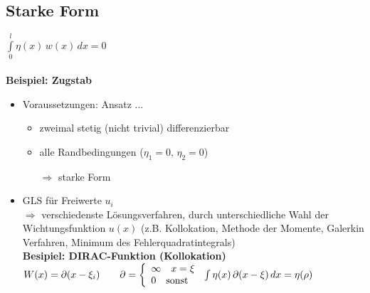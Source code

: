 \subsection{Starke Form}
{\boldmath\(\int\limits_0^l \eta (x) \, w(x) \, dx = 0\)}\\\\
\textbf{Beispiel: Zugstab}\\
\begin{itemize}
\item Voraussetzungen: Ansatz ...\\
	\begin{itemize}
	\item zweimal stetig (nicht trivial) differenzierbar
	\item alle Randbedingungen (\(\eta_1 = 0,\, \eta_2 = 0\))
	\item[$\Rightarrow$] starke Form 
	\end{itemize}
\item GLS für Freiwerte $u_i$\\
	$\Rightarrow$ verschiedenste Lösungsverfahren, durch unterschiedliche Wahl der Wichtungsfunktion $u(x)$ (z.B. Kollokation, Methode der Momente, Galerkin Verfahren, Minimum des Fehlerquadratintegrals)\\
	\textbf{Besipiel: DIRAC-Funktion (Kollokation)}\\
	\(W(x) = \partial (x - \xi_i) \qquad \partial = \left\{\begin{array}{l l} \infty \quad x = \xi \\ 0 \quad \text{sonst} \end{array} \right. \\ \int \eta (x) \, \partial (x - \xi)\,dx = \eta (\rho)\)
\end{itemize}


